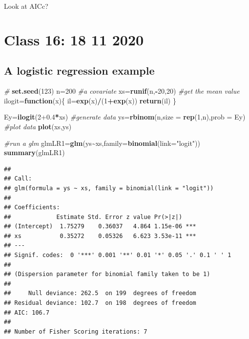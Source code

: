 \documentclass[
]{book}
\newenvironment{Shaded}{\begin{snugshade}}{\end{snugshade}}
\newcommand{\AttributeTok}[1]{\textcolor[rgb]{0.13,0.29,0.53}{#1}}
\newcommand{\CommentTok}[1]{\textcolor[rgb]{0.56,0.35,0.01}{\textit{#1}}}
\newcommand{\ControlFlowTok}[1]{\textcolor[rgb]{0.13,0.29,0.53}{\textbf{#1}}}
\newcommand{\DecValTok}[1]{\textcolor[rgb]{0.00,0.00,0.81}{#1}}
\newcommand{\FloatTok}[1]{\textcolor[rgb]{0.00,0.00,0.81}{#1}}
\newcommand{\FunctionTok}[1]{\textcolor[rgb]{0.13,0.29,0.53}{\textbf{#1}}}
\newcommand{\NormalTok}[1]{#1}
\newcommand{\OtherTok}[1]{\textcolor[rgb]{0.56,0.35,0.01}{#1}}
\newcommand{\SpecialCharTok}[1]{\textcolor[rgb]{0.81,0.36,0.00}{\textbf{#1}}}
\newcommand{\StringTok}[1]{\textcolor[rgb]{0.31,0.60,0.02}{#1}}
\begin{document}
Look at AICc?

\hypertarget{aula16}{%
\chapter{Class 16: 18 11 2020}\label{aula16}}

\hypertarget{a-logistic-regression-example}{%
\section{A logistic regression example}\label{a-logistic-regression-example}}

\begin{Shaded}
\begin{Highlighting}[]
\CommentTok{\#}
\FunctionTok{set.seed}\NormalTok{(}\DecValTok{123}\NormalTok{)}
\NormalTok{n}\OtherTok{=}\DecValTok{200}
\CommentTok{\#a covariate}
\NormalTok{xs}\OtherTok{=}\FunctionTok{runif}\NormalTok{(n,}\SpecialCharTok{{-}}\DecValTok{20}\NormalTok{,}\DecValTok{20}\NormalTok{)}
\CommentTok{\#get the mean value}
\NormalTok{ilogit}\OtherTok{=}\ControlFlowTok{function}\NormalTok{(x)\{}
\NormalTok{  il}\OtherTok{=}\FunctionTok{exp}\NormalTok{(x)}\SpecialCharTok{/}\NormalTok{(}\DecValTok{1}\SpecialCharTok{+}\FunctionTok{exp}\NormalTok{(x))}
\FunctionTok{return}\NormalTok{(il)}
\NormalTok{\}}

\NormalTok{Ey}\OtherTok{=}\FunctionTok{ilogit}\NormalTok{(}\DecValTok{2}\FloatTok{+0.4}\SpecialCharTok{*}\NormalTok{xs)}
\CommentTok{\#generate data}
\NormalTok{ys}\OtherTok{=}\FunctionTok{rbinom}\NormalTok{(n,}\AttributeTok{size =} \FunctionTok{rep}\NormalTok{(}\DecValTok{1}\NormalTok{,n),}\AttributeTok{prob =}\NormalTok{ Ey)}
\CommentTok{\#plot data}
\FunctionTok{plot}\NormalTok{(xs,ys)}


\CommentTok{\#run a glm}
\NormalTok{glmLR1}\OtherTok{=}\FunctionTok{glm}\NormalTok{(ys}\SpecialCharTok{\textasciitilde{}}\NormalTok{xs,}\AttributeTok{family=}\FunctionTok{binomial}\NormalTok{(}\AttributeTok{link=}\StringTok{"logit"}\NormalTok{))}
\FunctionTok{summary}\NormalTok{(glmLR1)}
\end{Highlighting}
\end{Shaded}

\begin{verbatim}
## 
## Call:
## glm(formula = ys ~ xs, family = binomial(link = "logit"))
## 
## Coefficients:
##             Estimate Std. Error z value Pr(>|z|)    
## (Intercept)  1.75279    0.36037   4.864 1.15e-06 ***
## xs           0.35272    0.05326   6.623 3.53e-11 ***
## ---
## Signif. codes:  0 '***' 0.001 '**' 0.01 '*' 0.05 '.' 0.1 ' ' 1
## 
## (Dispersion parameter for binomial family taken to be 1)
## 
##     Null deviance: 262.5  on 199  degrees of freedom
## Residual deviance: 102.7  on 198  degrees of freedom
## AIC: 106.7
## 
## Number of Fisher Scoring iterations: 7
\end{verbatim}
\end{document}
